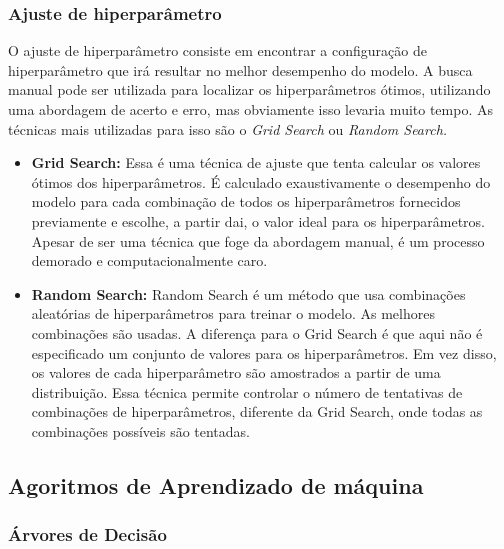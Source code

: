 \documentclass[
  letterpaper,
  DIV=11,
  numbers=noendperiod]{scrreprt}
\begin{document}
\hypertarget{ajuste-de-hiperparuxe2metro}{%
\subsubsection{Ajuste de
hiperparâmetro}\label{ajuste-de-hiperparuxe2metro}}

O ajuste de hiperparâmetro consiste em encontrar a configuração de
hiperparâmetro que irá resultar no melhor desempenho do modelo. A busca
manual pode ser utilizada para localizar os hiperparâmetros ótimos,
utilizando uma abordagem de acerto e erro, mas obviamente isso levaria
muito tempo. As técnicas mais utilizadas para isso são o \emph{Grid
Search} ou \emph{Random Search.}

\begin{itemize}
\item
  \textbf{Grid Search:} Essa é uma técnica de ajuste que tenta calcular
  os valores ótimos dos hiperparâmetros. É calculado exaustivamente o
  desempenho do modelo para cada combinação de todos os hiperparâmetros
  fornecidos previamente e escolhe, a partir dai, o valor ideal para os
  hiperparâmetros. Apesar de ser uma técnica que foge da abordagem
  manual, é um processo demorado e computacionalmente caro.
\item
  \textbf{Random Search:} Random Search é um método que usa combinações
  aleatórias de hiperparâmetros para treinar o modelo. As melhores
  combinações são usadas. A diferença para o Grid Search é que aqui não
  é especificado um conjunto de valores para os hiperparâmetros. Em vez
  disso, os valores de cada hiperparâmetro são amostrados a partir de
  uma distribuição. Essa técnica permite controlar o número de
  tentativas de combinações de hiperparâmetros, diferente da Grid
  Search, onde todas as combinações possíveis são tentadas.
\end{itemize}

\hypertarget{agoritmos-de-aprendizado-de-muxe1quina}{%
\subsection{Agoritmos de Aprendizado de
máquina}\label{agoritmos-de-aprendizado-de-muxe1quina}}

\hypertarget{uxe1rvores-de-decisuxe3o}{%
\subsubsection{Árvores de Decisão}\label{uxe1rvores-de-decisuxe3o}}
\end{document}
